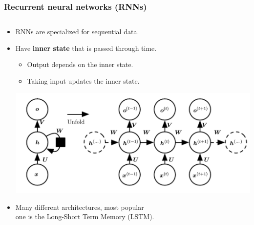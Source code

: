 \documentclass{beamer}
\begin{document}
\begin{frame}
	\frametitle{Recurrent neural networks (RNNs)}
	\pause
	\begin{columns}[T] %
		\begin{column}{0.75\textwidth}
	\begin{itemize}
		\item RNNs are specialized for sequential data. 
		\pause 
		\item Have \textbf{inner state} that is passed through time.
		
		\begin{itemize}
		\item Output depends on the inner state.
		\item Taking input updates the inner state.		
		\end{itemize}
	
	\begin{center}
		\includegraphics[scale=0.20]{rnn}		
	\end{center}
	\pause		
	\item Many different architectures, most popular \\ one  is the Long-Short Term Memory (LSTM).
	\end{itemize}


\end{column}
\end{columns}
\end{frame}
\end{document}
